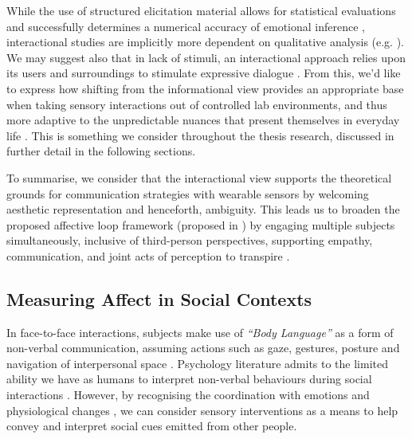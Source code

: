 While the use of structured elicitation material allows for statistical evaluations and successfully determines a numerical accuracy of emotional inference \cite{bota_review_2019}, interactional studies are implicitly more dependent on qualitative analysis (e.g. \cite{hook_embracing_2018,howell_life-affirming_2019}). We may suggest also that in lack of stimuli, an interactional approach relies upon its users and surroundings to stimulate expressive dialogue \cite{gonzalez_dance-inspired_2012}. From this, we'd like to express how shifting from the informational view provides an appropriate base when taking sensory interactions out of controlled lab environments, and thus more adaptive to the unpredictable nuances that present themselves in everyday life \cite{brown_into_2011,stjerna_aspects_2013,maki-petaja_aesthetic_2014}. This is something we consider throughout the thesis research, discussed in further detail in the following sections.


To summarise, we consider that the interactional view supports the theoretical grounds for communication strategies with wearable sensors by welcoming aesthetic representation and henceforth, ambiguity. This leads us to broaden the proposed affective loop framework (proposed in \cite{hook_affective_2009}) by engaging multiple subjects simultaneously, inclusive of third-person perspectives, supporting empathy, communication, and joint acts of perception to transpire \cite{turmo_vidal_designing_2021,francoise_designing_2017}.

\subsection{Measuring Affect in Social Contexts}
\label{lit_reivew:ssp}
In face-to-face interactions, subjects make use of \textit{``Body Language''} as a form of non-verbal communication, assuming actions such as gaze, gestures, posture and navigation of interpersonal space \cite{dobre_immersive_2022}. Psychology literature admits to the limited ability we have as humans to interpret non-verbal behaviours during social interactions \cite{joseph_emotional_2010}. However, by recognising the coordination with emotions and physiological changes \cite{mayer_human_2008}, we can consider sensory interventions as a means to help convey and interpret social cues emitted from other people.

